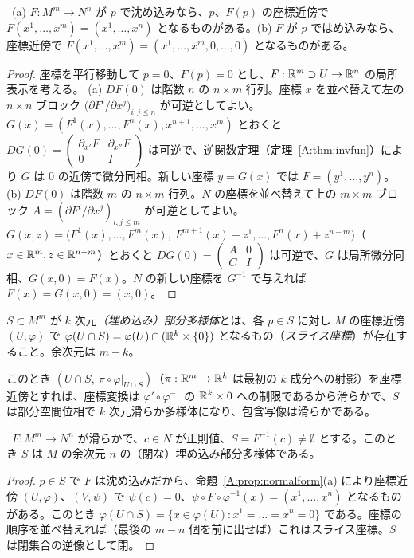 \begin{prop}[局所標準形]\label{A:prop:normalform}
\tP\ (a) $F:M^m\to N^n$ が $p$ で沈め込みなら、$p$、$F(p)$ の座標近傍で $F(x^1,\dots,x^m)=(x^1,\dots,x^n)$ となるものがある。(b) $F$ が $p$ ではめ込みなら、座標近傍で $F(x^1,\dots,x^m)=(x^1,\dots,x^m,0,\dots,0)$ となるものがある。
\end{prop}
\begin{proof}
座標を平行移動して $p=0$、$F(p)=0$ とし、$F:\mathbb R^m\supset U\to\mathbb R^n$ の局所表示を考える。
(a) $DF(0)$ は階数 $n$ の $n\times m$ 行列。座標 $x$ を並べ替えて左の $n\times n$ ブロック $\bigl(\partial F^i/\partial x^j\bigr)_{i,j\le n}$ が可逆としてよい。$G(x)=(F^1(x),\dots,F^n(x),x^{n+1},\dots,x^m)$ とおくと $DG(0)=\begin{pmatrix}\partial_{x'}F&\partial_{x''}F\\0&I\end{pmatrix}$ は可逆で、逆関数定理（定理~\ref{A:thm:invfun}）により $G$ は $0$ の近傍で微分同相。新しい座標 $y=G(x)$ では $F=(y^1,\dots,y^n)$。
(b) $DF(0)$ は階数 $m$ の $n\times m$ 行列。$N$ の座標を並べ替えて上の $m\times m$ ブロック $A=(\partial F^i/\partial x^j)_{i,j\le m}$ が可逆としてよい。$G(x,z)=\bigl(F^1(x),\dots,F^m(x),\ F^{m+1}(x)+z^{1},\dots,F^n(x)+z^{n-m}\bigr)$（$x\in\mathbb R^m,z\in\mathbb R^{n-m}$）とおくと $DG(0)=\begin{pmatrix}A&0\\C&I\end{pmatrix}$ は可逆で、$G$ は局所微分同相、$G(x,0)=F(x)$。$N$ の新しい座標を $G^{-1}$ で与えれば $F(x)=G(x,0)=(x,0)$。
\end{proof}

\begin{defn}[埋め込み部分多様体]
$S\subset M^m$ が $k$ 次元\emph{（埋め込み）部分多様体}とは、各 $p\in S$ に対し $M$ の座標近傍 $(U,\varphi)$ で $\varphi(U\cap S)=\varphi(U)\cap(\mathbb R^k\times\{0\})$ となるもの（\emph{スライス座標}）が存在すること。余次元は $m-k$。
\end{defn}

このとき $(U\cap S,\ \pi\circ\varphi|_{U\cap S})$（$\pi:\mathbb R^m\to\mathbb R^k$ は最初の $k$ 成分への射影）を座標近傍とすれば、座標変換は $\varphi'\circ\varphi^{-1}$ の $\mathbb R^k\times0$ への制限であるから滑らかで、$S$ は部分空間位相で $k$ 次元滑らか多様体になり、包含写像は滑らかである。

\begin{thm}[正則値定理]\label{A:thm:regval}
\tP\ $F:M^m\to N^n$ が滑らかで、$c\in N$ が正則値、$S=F^{-1}(c)\ne\emptyset$ とする。このとき $S$ は $M$ の余次元 $n$ の（閉な）埋め込み部分多様体である。
\end{thm}
\begin{proof}
$p\in S$ で $F$ は沈め込みだから、命題~\ref{A:prop:normalform}(a) により座標近傍 $(U,\varphi)$、$(V,\psi)$ で $\psi(c)=0$、$\psi\circ F\circ\varphi^{-1}(x)=(x^1,\dots,x^n)$ となるものがある。このとき $\varphi(U\cap S)=\{x\in\varphi(U):x^1=\dots=x^n=0\}$ である。座標の順序を並べ替えれば（最後の $m-n$ 個を前に出せば）これはスライス座標。$S$ は閉集合の逆像として閉。
\end{proof}


